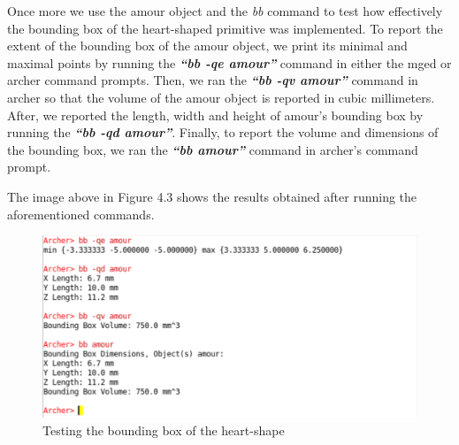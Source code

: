 \hspace{30} Once   more   we   use   the   amour   object   and   the   \textit{bb}   command   to   test   how  
effectively   the   bounding   box   of   the   heart­-shaped   primitive   was   implemented.  
To   report   the   extent   of   the   bounding   box   of   the   amour   object,   we   print   its  
minimal   and   maximal   points   by   running   the   \textit{\textbf{“bb   ­-qe   amour”}}   command   in   either  
the   mged   or   archer   command   prompts.   Then,   we   ran   the   \textit{\textbf{“bb   -­qv   amour”}}  
command   in   archer   so   that   the   volume   of   the   amour   object   is   reported   in   cubic  
millimeters.   After,   we   reported   the   length,   width   and   height   of   amour's   bounding  
box   by   running   the   \textit{\textbf{“bb   ­-qd   amour”}}.   Finally,   to   report   the   volume   and  
dimensions   of   the   bounding   box,   we   ran   the   \textit{\textbf{“bb   amour”}}   command   in   archer's  
command prompt. 

\hspace{30} The image above in Figure 4.3 shows the results obtained after running the aforementioned commands. 

\begin{figure}[htbp]
\centering
\includegraphics[trim=0.0cm 0.5cm 0.1cm 0.1cm, clip=true, totalheight=0.4\textheight]{Pictures/Bounding.png}
\caption[Testing the bounding box of the heart­-shape]{Testing the bounding box of the heart­-shape}
\label{Bounding}
\end{figure}

\clearpage


